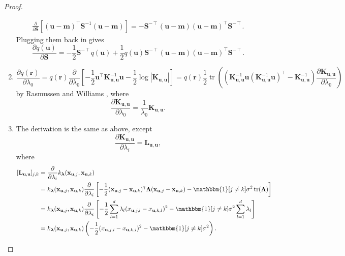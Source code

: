 \documentclass{article}
\theoremstyle{definition}
\theoremstyle{remark}
\DeclareMathOperator{\tr}{tr}
\newcommand{\Kuu}{\mathbf{K}_{\mathbf{u},\mathbf{u}}}
\newcommand{\Luu}{\mathbf{L}_{\mathbf{u},\mathbf{u}}}
\newcommand{\dS}{\frac{\partial}{\partial\mathbf{S}}}
\newcommand{\dlz}{\frac{\partial}{\partial \lambda_0}}
\newcommand{\dl}{\frac{\partial}{\partial \lambda_i}}
\begin{document}
\begin{proof}
\begin{enumerate}
\begin{gather*}
      \dS[(\mathbf{u} - \mathbf{m})^\intercal\mathbf{S}^{-1}(\mathbf{u} -
      \mathbf{m})] = -\mathbf{S}^{-\intercal}(\mathbf{u} - \mathbf{m})(\mathbf{u} -
                     \mathbf{m})^\intercal\mathbf{S}^{-\intercal}.
    \end{gather*}
    Plugging them back in gives
    \[
      \frac{\partial q(\mathbf{u})}{\partial \mathbf{S}} =
      -\frac{1}{2}\mathbf{S}^{-\intercal}q(\mathbf{u}) +
      \frac{1}{2}q(\mathbf{u})\mathbf{S}^{-\intercal}(\mathbf{u} -
      \mathbf{m})(\mathbf{u} - \mathbf{m})^\intercal\mathbf{S}^{-\intercal}.
    \]
  \item
    \[
      \frac{\partial q(\mathbf{r})}{\partial \lambda_0} = q(\mathbf{r}) \dlz
      \left[-\frac{1}{2}\mathbf{u}^\intercal\Kuu^{-1}\mathbf{u} -
        \frac{1}{2}\log|\Kuu| \right] = q(\mathbf{r})\frac{1}{2}\tr
      \left((\Kuu^{-1}\mathbf{u}(\Kuu^{-1}\mathbf{u})^\intercal - \Kuu^{-1})
        \frac{\partial \Kuu}{\partial \lambda_0} \right)
    \]
    by Rasmussen and Williams \cite{DBLP:books/lib/RasmussenW06}, where
    \[
      \frac{\partial \Kuu}{\partial \lambda_0} = \frac{1}{\lambda_0}\Kuu.
    \]
  \item The derivation is the same as above, except
    \[
      \frac{\partial \Kuu}{\partial \lambda_i} = \Luu,
    \]
    where
    \[
      \begin{split}
        [\Luu]_{j,k} &= \dl k_{\bm\lambda}(\mathbf{x}_{\mathbf{u},j},
        \mathbf{x}_{\mathbf{u},k}) \\
        &= k_{\bm\lambda}(\mathbf{x}_{\mathbf{u},j}, \mathbf{x}_{\mathbf{u},k})
        \dl \left[-\frac{1}{2}(\mathbf{x}_{\mathbf{u},j} -
          \mathbf{x}_{\mathbf{u},k})^\intercal \bm\Lambda
          (\mathbf{x}_{\mathbf{u},j} - \mathbf{x}_{\mathbf{u},k}) -
          \mathbbm{1}[j \ne k]\sigma^2\tr(\bm\Lambda) \right] \\
        &= k_{\bm\lambda}(\mathbf{x}_{\mathbf{u},j}, \mathbf{x}_{\mathbf{u},k})
        \dl \left[-\frac{1}{2}\sum_{l=1}^d \lambda_l
          (x_{\mathbf{u},j,l} - x_{\mathbf{u},k,l})^2 -
          \mathbbm{1}[j \ne k]\sigma^2\sum_{l=1}^d \lambda_l \right] \\
        &= k_{\bm\lambda}(\mathbf{x}_{\mathbf{u},j}, \mathbf{x}_{\mathbf{u},k})
        \left( -\frac{1}{2}(x_{\mathbf{u},j,i} -
        x_{\mathbf{u},k,i})^2 - \mathbbm{1}[j \ne k]\sigma^2 \right).
      \end{split}
    \]
  \end{enumerate}
\end{proof}
\end{document}
